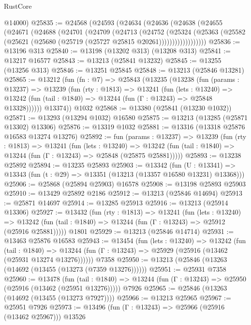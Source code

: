 \begin{lexlean}{RustCore}
\begin{coremodule}
      @14000)
@25835 := @24568
    (@24593
      (@24634
        (@24636
          (@24638
            (@24655
              (@24671
                (@24688
                  (@24701
                    (@24709
                      (@24713
                        (@24752
                          (@25324
                            (@25363
                              (@25582
                                (@25621 (@25680 (@25719 (@25727 @25815 @20261))))))))))))))))))
@25836 := @13196 @313
@25840 := @13198 (@13202 @313) (@13208 @313)
@25841 := @13217 @16577
@25843 := @13213 (@25841 @13232)
@25845 := @13255 (@13256 @313)
@25846 := @13251 @25845
@25848 := @13213 (@25846 @13281)
@25865 := @13212
    (fun (fn : @7) =>
    @25843
      (@13235
        (@13238
          (fun (params : @13237) =>
          @13239
            (fun (rty : @1813) =>
            @13241
              (fun (lets : @13240) =>
              @13242 (fun (tail : @1840) => @13244 (fun (Γ : @13243) => @25848 @13328))))))
        @13374))
    @1032
@25868 := @13380 (@25841 (@13230 @1032))
@25871 := @13293 (@13294 @1032) @16580
@25875 := @13213 (@13285 (@25871 @13302) @13306)
@25876 := @13319 @1032
@25881 := @13316 (@13318 @25876 @16583 @13274 @13276)
@25892 := fun (params : @13237) =>
  @13239
    (fun (rty : @1813) =>
    @13241
      (fun (lets : @13240) =>
      @13242 (fun (tail : @1840) => @13244 (fun (Γ : @13243) => @25848 (@25875 @25881)))))
@25893 := @13238 @25892
@25894 := @13235 @25893
@25903 := @13342
    (fun (U : @13341) => @13343 (fun (t : @29) => @13351 (@13213 (@13357 @16580 @13231) @13368)))
@25906 := @25868 (@25894 @25903) @16578
@25908 := @13198 @25893 @25903
@25910 := @13429 @25892 @2186
@25912 := @13213 (@25846 @14694)
@25913 := @25871 @14697
@25914 := @13285 @25913
@25916 := @13213 (@25914 @13306)
@25927 := @13432
    (fun (rty : @1813) =>
    @13241
      (fun (lets : @13240) =>
      @13242 (fun (tail : @1840) => @13244 (fun (Γ : @13243) => @25912 (@25916 @25881)))))
    @1801
@25929 := @13213 (@25846 @14714)
@25931 := @13463 @25876 @16583
@25943 := @13454
    (fun (lets : @13240) =>
    @13242
      (fun (tail : @1840) =>
      @13244 (fun (Γ : @13243) => @25929 (@25916 (@13462 (@25931 @13274 @13276))))))
    @7358
@25950 := @13213 (@25846 (@13263 (@14692 (@13455 (@13273 (@7359 @13276))))))
@25951 := @25931 @7358
@25960 := @13478
    (fun (tail : @1840) => @13244 (fun (Γ : @13243) => @25950 (@25916 (@13462 (@25951 @13276)))))
    @7926
@25965 := @25846 (@13263 (@14692 (@13455 (@13273 @7927))))
@25966 := @13213 @25965
@25967 := @25951 @7926
@25973 := @13496 (fun (Γ : @13243) => @25966 (@25916 (@13462 @25967))) @13526

\end{coremodule}
\end{lexlean}
